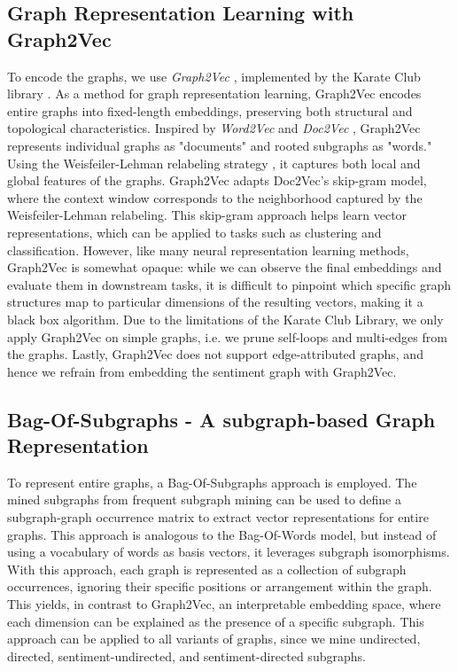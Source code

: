\subsection{Graph Representation Learning with Graph2Vec}
To encode the graphs, we use \textit{Graph2Vec} \citep{graph2vec}, implemented by the Karate Club library \citep{karateclub}. As a method for graph representation learning, Graph2Vec encodes entire graphs into fixed-length embeddings, preserving both structural and topological characteristics. Inspired by \textit{Word2Vec} \citep{word2vec} and \textit{Doc2Vec} \citep{doc2vec}, Graph2Vec represents individual graphs as "documents" and rooted subgraphs as "words." Using the Weisfeiler-Lehman relabeling strategy \citep{shervashidze2011weisfeiler}, it captures both local and global features of the graphs. Graph2Vec adapts Doc2Vec’s skip-gram model, where the context window corresponds to the neighborhood captured by the Weisfeiler-Lehman relabeling. This skip-gram approach helps learn vector representations, which can be applied to tasks such as clustering and classification. However, like many neural representation learning methods, Graph2Vec is somewhat opaque: while we can observe the final embeddings and evaluate them in downstream tasks, it is difficult to pinpoint which specific graph structures map to particular dimensions of the resulting vectors, making it a black box algorithm. Due to the limitations of the Karate Club Library, we only apply Graph2Vec on simple graphs, i.e. we prune self-loops and multi-edges from the graphs. Lastly, Graph2Vec does not support edge-attributed graphs, and hence we refrain from embedding the sentiment graph with Graph2Vec. 

\subsection{Bag-Of-Subgraphs - A subgraph-based Graph Representation}
To represent entire graphs, a Bag-Of-Subgraphs approach is employed. The mined subgraphs from frequent subgraph mining can be used to define a subgraph-graph occurrence matrix to extract vector representations for entire graphs. This approach is analogous to the Bag-Of-Words model, but instead of using a vocabulary of words as basis vectors, it leverages subgraph isomorphisms. With this approach, each graph is represented as a collection of subgraph occurrences, ignoring their specific positions or arrangement within the graph. This yields, in contrast to Graph2Vec, an interpretable embedding space, where each dimension can be explained as the presence of a specific subgraph. This approach can be applied to all variants of graphs, since we mine undirected, directed, sentiment-undirected, and sentiment-directed subgraphs.



